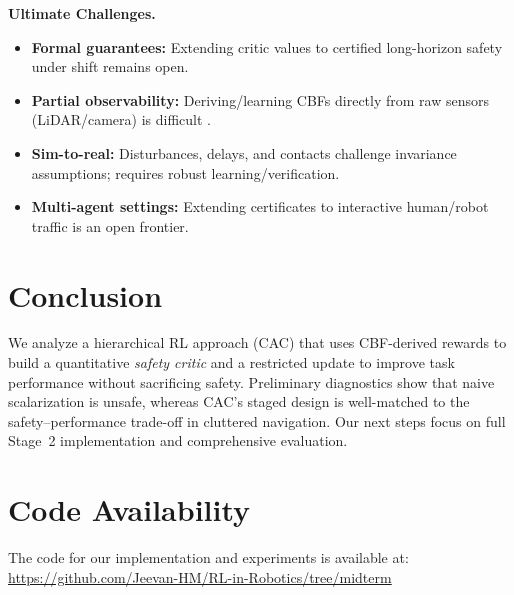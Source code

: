 \documentclass[10pt,conference]{IEEEtran}
\begin{document}
\textbf{Ultimate Challenges.}
\begin{itemize}
    \item \textbf{Formal guarantees:} Extending critic values to certified long-horizon safety under shift remains open.
    \item \textbf{Partial observability:} Deriving/learning CBFs directly from raw sensors (LiDAR/camera) is difficult \cite{Harms2024NeuralCBF}.
    \item \textbf{Sim-to-real:} Disturbances, delays, and contacts challenge invariance assumptions; requires robust learning/verification.
    \item \textbf{Multi-agent settings:} Extending certificates to interactive human/robot traffic is an open frontier.
\end{itemize}

\section{Conclusion}
We analyze a hierarchical RL approach (CAC) that uses CBF-derived rewards to build a quantitative \emph{safety critic} and a restricted update to improve task performance without sacrificing safety. Preliminary diagnostics show that naive scalarization is unsafe, whereas CAC’s staged design is well-matched to the safety–performance trade-off in cluttered navigation. Our next steps focus on full Stage~2 implementation and comprehensive evaluation.

\section*{Code Availability}
The code for our implementation and experiments is available at: \url{https://github.com/Jeevan-HM/RL-in-Robotics/tree/midterm}
\end{document}
